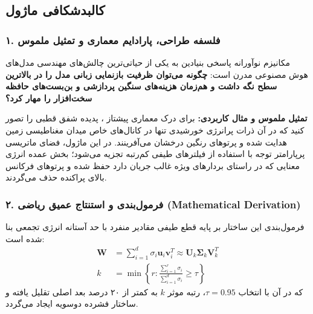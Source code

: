 \subsection{کالبدشکافی ماژول }

\subsubsection*{۱. فلسفه طراحی، پارادایم معماری و تمثیل ملموس}
مکانیزم نوآورانه  پاسخی بنیادین به یکی از حیاتی‌ترین چالش‌های مهندسی مدل‌های هوش مصنوعی مدرن است: \textbf{چگونه می‌توان ظرفیت بازنمایی زبانی مدل را در بالاترین سطح نگه داشت و هم‌زمان هزینه‌های سنگین پردازشی و بن‌بست‌های حافظه سخت‌افزار را مهار کرد؟}

\textbf{تمثیل ملموس و مثال کاربردی:}
برای درک معماری پیشتاز ، پدیده شفق قطبی را تصور کنید که در آن ذرات پرانرژی خورشیدی تنها در کانال‌های خاص میدان مغناطیسی زمین هدایت شده و پرتوهای رنگین درخشان می‌آفرینند. در این ماژول، فضای ماتریسی پرپارامتر توجه با استفاده از فیلترهای طیفی کم‌رتبه تجزیه می‌شود؛ بخش عمده انرژی معنایی که در راستای بردارهای ویژه غالب جریان دارد حفظ شده و پرتوهای فرکانس بالای پراکنده حذف می‌گردند.

\subsubsection*{۲. فرمول‌بندی و استنتاج عمیق ریاضی (Mathematical Derivation)}
فرمول‌بندی این ساختار بر پایه قطع طیفی مقادیر منفرد با حد آستانه انرژی تجمعی بنا شده است:
\begin{align}
\mathbf{W} &= \sum_{i=1}^d \sigma_i \mathbf{u}_i \mathbf{v}_i^T \approx \mathbf{U}_k \mathbf{\Sigma}_k \mathbf{V}_k^T \\
k &= \min \left\{ r : \frac{\sum_{i=1}^r \sigma_i}{\sum_{i=1}^d \sigma_i} \ge \tau \right\}
\end{align}
که در آن با انتخاب $\tau = 0.95$، رتبه موثر $k$ به کمتر از ۲۰ درصد بعد اصلی تقلیل یافته و ساختار فشرده دوسویه ایجاد می‌گردد.

